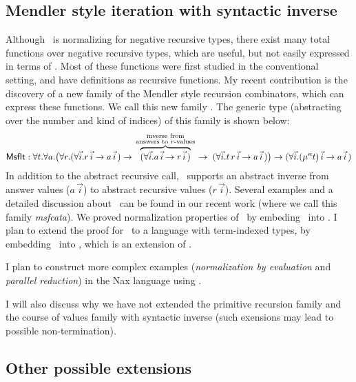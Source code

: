 \subsection{Mendler style iteration with syntactic inverse}
Although \MIt\ is normalizing for negative recursive types, there exist
many total functions over negative recursive types, which are
useful, but not easily expressed in terms of \MIt. Most of these functions
were first studied in the conventional setting, and have definitions as
recursive functions. My recent contribution is
the discovery of a new family of the Mendler style recursion combinators,
which can express these functions. We call this new family \MsfIt.
The generic type (abstracting over the number and kind of indices) 
of this family is shown below:
\label{sec:mendler:sf}
\[
 \textsf{MsfIt} : \forall t . \forall a .
   \big( \forall r.
            (\forall\vec{i} . r\,\vec{i} -> a\,\vec{i}\,)
   -> \overset{\begin{smallmatrix}
                        \text{inverse from} \\
                        \text{answers to $r$-values} \\
                       \end{smallmatrix}}{\overbrace{
            (\forall\vec{i} . a\,\vec{i} -> r\,\vec{i}\,) }}
   -> \;    (\forall\vec{i} . t \, r\,\vec{i} -> a\,\vec{i}\,)
   \big)
 -> (\forall\vec{i} . (\mu^\kappa t)\,\vec{i} -> a\,\vec{i}\,)
\]
In addition to the abstract recursive call, \MsfIt\ supports an abstract
inverse from answer values ($a \,\vec{i}$) to abstract recursive values ($r\,\vec{i}$).
Several examples and a detailed discussion about \MsfIt\ can be found in
our recent work \cite{AhnShe11} (where we call this family \textit{msfcata}).
We \cite{AhnShe11} proved normalization properties of \MsfIt\ by
embeding \MsfIt\ into \Fw. I plan to extend the proof for \MsfIt\,
to a language with term-indexed types, by embedding \MsfIt\
into \Fi, which is an extension of \Fw.

I plan to construct more complex examples
(\emph{normalization by evaluation} and \emph{parallel reduction})
in the Nax language using \MsfIt.

I will also discuss why we have not extended the primitive recursion family
and the course of values family with syntactic inverse (such exensions
may lead to possible non-termination).


\subsection{Other possible extensions}\label{sec:mendler:etc}

